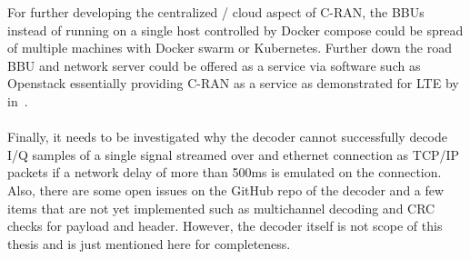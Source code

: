 For further developing the centralized / cloud aspect of C-RAN, the BBUs instead of running on a single host
controlled by Docker compose could be spread of multiple machines with Docker swarm or Kubernetes. 
Further down the road BBU and network server could be offered as a service via software such as Openstack 
essentially providing C-RAN as a service as demonstrated for LTE by in~\cite{Nikaein2015}.
\\ \\
Finally, it needs to be investigated why the decoder cannot successfully decode I/Q samples of a single signal streamed over and ethernet connection as TCP/IP packets 
if a network delay of more than 500ms is emulated on the connection. Also, there are some open issues on the 
GitHub repo of the decoder and a few items that are not yet implemented such as multichannel decoding and 
CRC checks for payload and header. However, the decoder itself is not scope of this thesis and is just mentioned here for 
completeness.


